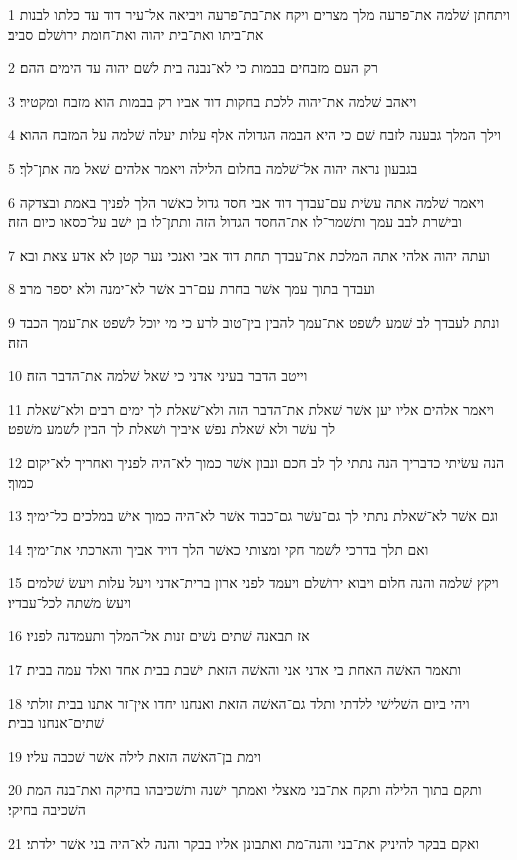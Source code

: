 \par 1 ויתחתן שׁלמה את־פרעה מלך מצרים ויקח את־בת־פרעה ויביאה אל־עיר דוד עד כלתו לבנות את־ביתו ואת־בית יהוה ואת־חומת ירושׁלם סביב׃
\par 2 רק העם מזבחים בבמות כי לא־נבנה בית לשׁם יהוה עד הימים ההם׃
\par 3 ויאהב שׁלמה את־יהוה ללכת בחקות דוד אביו רק בבמות הוא מזבח ומקטיר׃
\par 4 וילך המלך גבענה לזבח שׁם כי היא הבמה הגדולה אלף עלות יעלה שׁלמה על המזבח ההוא׃
\par 5 בגבעון נראה יהוה אל־שׁלמה בחלום הלילה ויאמר אלהים שׁאל מה אתן־לך׃
\par 6 ויאמר שׁלמה אתה עשׂית עם־עבדך דוד אבי חסד גדול כאשׁר הלך לפניך באמת ובצדקה ובישׁרת לבב עמך ותשׁמר־לו את־החסד הגדול הזה ותתן־לו בן ישׁב על־כסאו כיום הזה׃
\par 7 ועתה יהוה אלהי אתה המלכת את־עבדך תחת דוד אבי ואנכי נער קטן לא אדע צאת ובא׃
\par 8 ועבדך בתוך עמך אשׁר בחרת עם־רב אשׁר לא־ימנה ולא יספר מרב׃
\par 9 ונתת לעבדך לב שׁמע לשׁפט את־עמך להבין בין־טוב לרע כי מי יוכל לשׁפט את־עמך הכבד הזה׃
\par 10 וייטב הדבר בעיני אדני כי שׁאל שׁלמה את־הדבר הזה׃
\par 11 ויאמר אלהים אליו יען אשׁר שׁאלת את־הדבר הזה ולא־שׁאלת לך ימים רבים ולא־שׁאלת לך עשׁר ולא שׁאלת נפשׁ איביך ושׁאלת לך הבין לשׁמע משׁפט׃
\par 12 הנה עשׂיתי כדבריך הנה נתתי לך לב חכם ונבון אשׁר כמוך לא־היה לפניך ואחריך לא־יקום כמוך׃
\par 13 וגם אשׁר לא־שׁאלת נתתי לך גם־עשׁר גם־כבוד אשׁר לא־היה כמוך אישׁ במלכים כל־ימיך׃
\par 14 ואם תלך בדרכי לשׁמר חקי ומצותי כאשׁר הלך דויד אביך והארכתי את־ימיך׃
\par 15 ויקץ שׁלמה והנה חלום ויבוא ירושׁלם ויעמד לפני ארון ברית־אדני ויעל עלות ויעשׂ שׁלמים ויעשׂ משׁתה לכל־עבדיו׃
\par 16 אז תבאנה שׁתים נשׁים זנות אל־המלך ותעמדנה לפניו׃
\par 17 ותאמר האשׁה האחת בי אדני אני והאשׁה הזאת ישׁבת בבית אחד ואלד עמה בבית׃
\par 18 ויהי ביום השׁלישׁי ללדתי ותלד גם־האשׁה הזאת ואנחנו יחדו אין־זר אתנו בבית זולתי שׁתים־אנחנו בבית׃
\par 19 וימת בן־האשׁה הזאת לילה אשׁר שׁכבה עליו׃
\par 20 ותקם בתוך הלילה ותקח את־בני מאצלי ואמתך ישׁנה ותשׁכיבהו בחיקה ואת־בנה המת השׁכיבה בחיקי׃
\par 21 ואקם בבקר להיניק את־בני והנה־מת ואתבונן אליו בבקר והנה לא־היה בני אשׁר ילדתי׃
